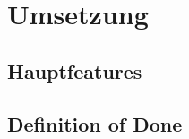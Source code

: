 \documentclass[../main.tex]{subfiles}
\begin{document}
	\section{Umsetzung}
	\subsection{Hauptfeatures}
	\label{section:Hauptfeatures}
	\subsection{Definition of Done}
	\label{section:DefinitionOfDone}
	
\end{document}
